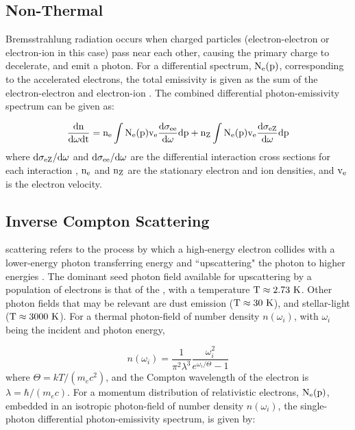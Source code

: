 \subsection{Non-Thermal \brems{}}\label{gamAstr:bremss}
Bremsstrahlung radiation occurs when charged particles (electron-electron or electron-ion in this case) pass near each other, causing the  primary charge to decelerate, and emit a photon. For a differential spectrum, ${\rm N_e(p)}$, corresponding to the accelerated electrons, the total emissivity is given as the sum of the electron-electron and electron-ion \brems{}. The combined differential photon-emissivity spectrum can be given as:

\begin{equation}
{\rm \frac{d n}{d \omega d t} =
	n_e \int
	N_e(p) v_e
	\frac{d \sigma_{e e}}{d \omega}dp +
	n_Z \int
	N_e(p) v_e
	\frac{d \sigma_{e Z}}{d \omega}dp}
\end{equation}
where ${\rm d \sigma_{e Z}/d \omega}$ and ${\rm d \sigma_{e e}/d \omega}$ are the differential interaction cross sections for each interaction \citep{Koch59,Haug75}, ${\rm n_e}$ and ${\rm n_Z}$ are the stationary electron and ion densities, and ${\rm v_e}$ is the electron velocity.

\subsection{Inverse Compton Scattering}\label{gamAstr:IC}

\ic{} scattering refers to the process by which a high-energy electron collides with a lower-energy photon transferring energy and ``upscattering" the photon to higher energies \citep{Blumenthal70}. The dominant seed photon field available for upscattering by a population of electrons is that of the \cmb{}, with a temperature ${\rm T \approx 2.73~K}$. Other photon fields that may be relevant are \fir{} dust emission (${\rm T \approx 30~K}$), and \nir{} stellar-light (${\rm T \approx 3000~K}$). For a thermal photon-field of number density $n(\omega_i)$, with $\omega_i$ being the incident and photon energy,

\begin{equation}
n(\omega_i) = 
\frac{1}{\pi^2\lambda^3} 
\frac{\omega_i^2}{e^{\omega_i/\Theta} -1}
\end{equation}
where  $\Theta=kT/(m_e c^2)$, and the Compton wavelength of the electron is $\lambda=\hbar/(m_e c)$.
For a momentum distribution of relativistic electrons, ${\rm N_e(p)}$, embedded in an isotropic photon-field of number density $n(\omega_i)$, the single-photon differential photon-emissivity spectrum,  is given by:


